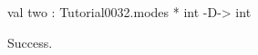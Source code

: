 \runverbatimtrue
{}
\begin{RunVerbatimMsg}
val two : Tutorial0032.modes * int -D-> int
\end{RunVerbatimMsg}
\begin{RunVerbatimErr}
Success.
\end{RunVerbatimErr}
